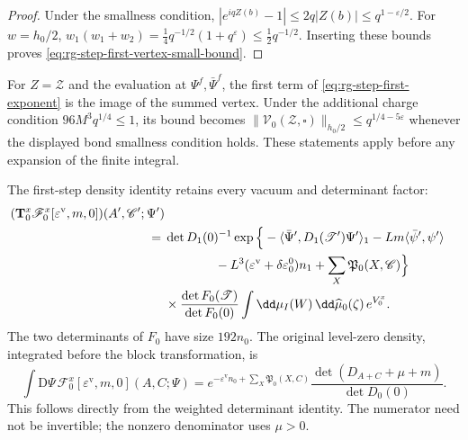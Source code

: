 \begin{proof}
Under the smallness condition,
$|e^{iqZ(b)}-1|\le2q|Z(b)|\le q^{1-\varepsilon/2}$.
For $w=h_0/2$,
$w_1(w_1+w_2)=\frac14q^{-1/2}(1+q^\varepsilon)
\le\frac12q^{-1/2}$. Inserting these bounds proves
\eqref{eq:rg-step-first-vertex-small-bound}.
\end{proof}

For $Z=\mathscr Z$ and the evaluation at
$\Psi^f,\bar\Psi^f$, the first term of
\eqref{eq:rg-step-first-exponent} is the image of
the summed vertex. Under the additional charge
condition $96M^3q^{1/4}\le1$, its bound becomes
$\|\mathcal V_0(\mathscr Z,\square)\|_{h_0/2}
\le q^{1/4-5\varepsilon}$ whenever the displayed
bond smallness condition holds. These statements
apply before any expansion of the finite integral.

The first-step density identity retains every
vacuum and determinant factor:
\begin{equation}\label{eq:rg-step-first-density}
 \begin{split}
 (\mathbf T_0^x\mathscr F_0^x[\varepsilon^{\mathrm v},m,0])
                                    (A',\mathscr C';\Psi')\\
  ={}&\det D_1(0)^{-1}
       \exp\Big\{-\langle\bar\Psi',D_1(\mathscr T')\Psi'\rangle_1
                   -Lm\langle\bar\psi',\psi'\rangle\\
      &\hspace{14mm}
                   -L^3(\varepsilon^{\mathrm v}
                        +\delta\varepsilon_0^0)n_1
                   +\sum_X\mathfrak P_0(X,\mathscr C)\Big\}\\
       &\times
              \frac{\det F_0(\mathscr T)}{\det F_0(0)}
        \int\dd\mu_I(W)\,\dd\widehat\mu_0(\zeta)\,e^{V_0^x}.
 \end{split}
\end{equation}
The two determinants of $F_0$ have size $192n_0$.
The original level-zero density, integrated before
the block transformation, is
\begin{equation}\label{eq:rg-step-initial-integrated-density}
 \int\mathrm D\Psi\,\mathscr F_0^x
                     [\varepsilon^{\mathrm v},m,0](A,C;\Psi)
     =e^{-\varepsilon^{\mathrm v}n_0+\sum_X\mathfrak P_0(X,C)}
               \frac{\det(D_{A+C}+\mu+m)}{\det D_0(0)}.
\end{equation}
This follows directly from the weighted determinant
identity. The numerator need not be invertible;
the nonzero denominator uses $\mu>0$.


